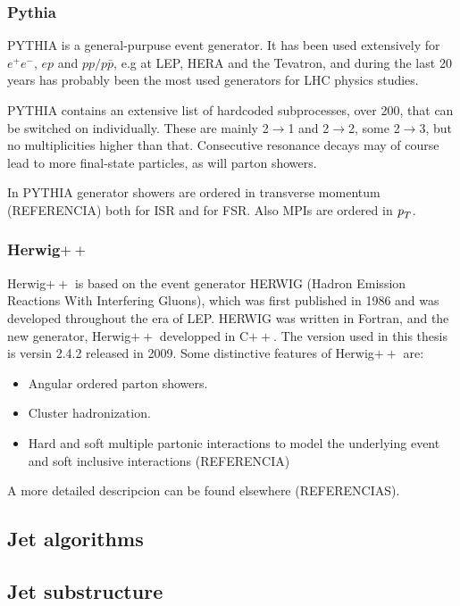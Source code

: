 \subsubsection{Pythia}

PYTHIA is a general-purpuse event generator. It has been used extensively for $e^+ e^-$, $ep$ and $pp/p\bar{p}$, e.g at LEP, HERA and the Tevatron, and during the last 20 years has probably been the most used generators for LHC physics studies. 


PYTHIA contains an extensive list of hardcoded subprocesses, over 200, that can be switched on individually. These are mainly 2$\rightarrow$1 and  2$\rightarrow$2, some  2$\rightarrow$3, but no multiplicities higher than that. Consecutive resonance decays may of course lead to more final-state particles, as will parton showers.

In PYTHIA generator showers are ordered in transverse momentum (REFERENCIA)%
both for ISR and for FSR. Also MPIs are ordered in ${\emph{p}_{T}}$.



\subsubsection{Herwig$++$}

Herwig$++$ is based on the event generator HERWIG (Hadron Emission Reactions With Interfering Gluons), which was first published in 1986 and was developed throughout the era of LEP.  HERWIG was written in Fortran, and the new generator, Herwig$++$ developped in C$++$. The version used in this thesis is versin 2.4.2 released in 2009. Some distinctive features of Herwig$++$ are:

\begin{itemize}\addtolength{\itemsep}{-0.4\baselineskip}
\item
Angular ordered parton showers.
\item
Cluster hadronization.
\item 
Hard and soft multiple partonic interactions to model the underlying event and soft inclusive interactions (REFERENCIA) %
\end{itemize}


A more detailed descripcion can be found elsewhere (REFERENCIAS).

\subsection{Jet algorithms}

\subsection{Jet substructure}
